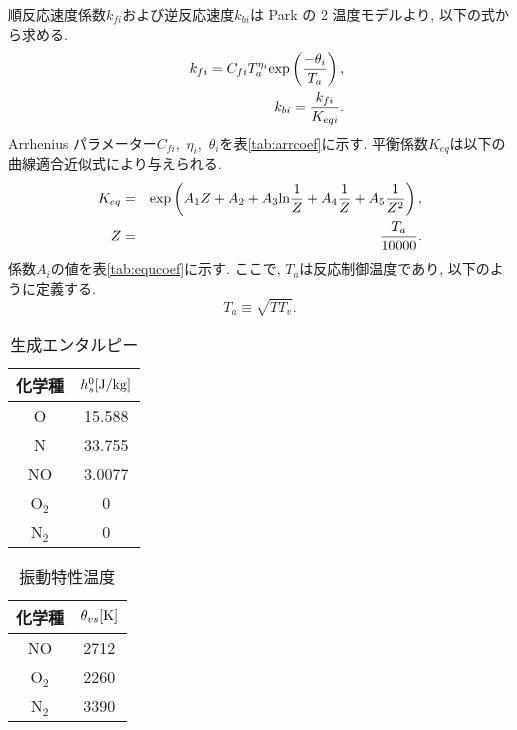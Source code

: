 順反応速度係数$k_{fi}$および逆反応速度$k_{bi}$は Park の 2 温度モデル\cite{park}より,
以下の式から求める.
\begin{eqnarray}
&&k_{fi}=C_{fi}T^{\eta_{i}}_{a}{\rm exp} \left( \frac{-\theta_{i}}{T_{a}} \right),\\
&&k_{bi}=\frac{k_{fi}}{K_{eqi}}.
\end{eqnarray}
Arrhenius パラメーター$C_{fi}$,~${\eta_i}$,~${\theta_i}$を表\ref{tab:arrcoef}に示す.
平衡係数$K_{eq}$は以下の曲線適合近似式により与えられる.
\begin{eqnarray}
K_{eq}&=&{\rm exp} \left( A_1Z+A_2+A_3{\rm ln}\frac{1}{Z}+A_4\frac{1}{Z}+A_5\frac{1}{Z^2} \right),\\
Z&=&\frac{T_a}{10000}.
\end{eqnarray}
係数$A_{i}$の値を表\ref{tab:equcoef}に示す.
ここで,
$T_a$は反応制御温度であり,
以下のように定義する.
\begin{equation}
T_a \equiv \sqrt{TT_v}.
\end{equation}


     \begin{table}[!htbp]
      \begin{center}
       \caption{生成エンタルピー}
        \begin{tabular}{c c} \hline \hline
                        化学種 & $h^{0}_{s}[{\rm J/kg}]$\\ \hline 
                             O    & 15.588 \\
                             N    & 33.755 \\
                             NO   & 3.0077 \\
                             O$_2$& 0 \\
                             N$_2$& 0 \\ 
                             \hline \hline
        \end{tabular}
       \label{tab:genenthlpy}
      \end{center}
     \end{table} 

     \begin{table}[!htbp]
      \begin{center}
       \caption{振動特性温度}
        \begin{tabular}{c c} \hline \hline
                        化学種 & $\theta_{vs}[{\rm K}]$\\ \hline 
                             NO   & 2712 \\
                             O$_2$& 2260 \\
                             N$_2$& 3390 \\ 
                             \hline \hline
        \end{tabular}
       \label{tab:vibchatem}
      \end{center}
     \end{table} 

